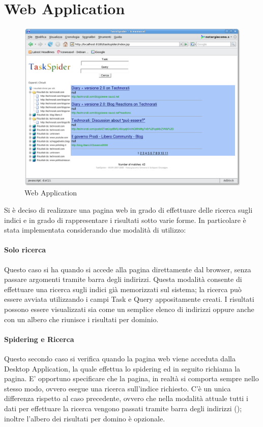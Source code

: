 \section{Web Application}
\begin{figure}[htb]
\begin{center}
\includegraphics[scale=0.35]{etc/webApp.png}
\caption{Web Application}
\label{webApp}
\end{center}
\end{figure}
Si è deciso di realizzare una pagina web in grado di effettuare delle ricerca sugli indici e in grado di rappresentare i risultati sotto varie forme. In particolare è stata implementata considerando due modalità di utilizzo:
\paragraph{Solo ricerca}
Questo caso si ha quando si accede alla pagina direttamente dal browser, senza passare argomenti tramite barra degli indirizzi. Questa modalità consente di effettuare una ricerca sugli indici già memorizzati sul sistema; la ricerca può essere avviata utilizzando i campi Task e Query appositamente creati. I risultati possono essere visualizzati sia come un semplice elenco di indirizzi oppure anche con un albero che riunisce i risultati per dominio.
\paragraph{Spidering e Ricerca}
Questo secondo caso si verifica quando la pagina web viene acceduta dalla Desktop Application, la quale effettua lo spidering ed in seguito richiama la pagina. E' opportuno specificare che la pagina, in realtà si comporta sempre nello stesso modo, ovvero esegue una ricerca sull'indice richiesto. C'è un unica differenza rispetto al caso precedente, ovvero che nella modalità attuale tutti i dati per effettuare la ricerca vengono passati tramite barra degli indirizzi (); inoltre l'albero dei risultati per domino è opzionale.